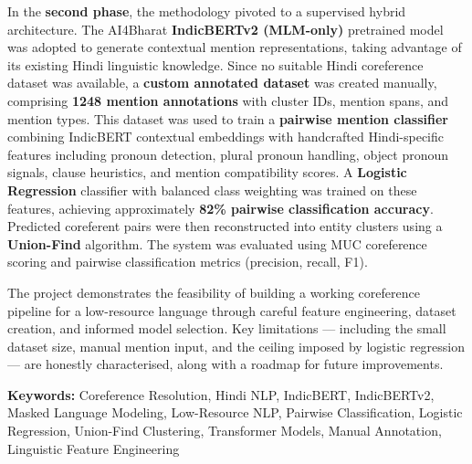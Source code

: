 \documentclass[12pt,a4paper]{report}
\begin{document}
\noindent In the \textbf{second phase}, the methodology pivoted to a supervised hybrid architecture. The AI4Bharat \textbf{IndicBERTv2 (MLM-only)} pretrained model was adopted to generate contextual mention representations, taking advantage of its existing Hindi linguistic knowledge. Since no suitable Hindi coreference dataset was available, a \textbf{custom annotated dataset} was created manually, comprising \textbf{1248 mention annotations} with cluster IDs, mention spans, and mention types. This dataset was used to train a \textbf{pairwise mention classifier} combining IndicBERT contextual embeddings with handcrafted Hindi-specific features including pronoun detection, plural pronoun handling, object pronoun signals, clause heuristics, and mention compatibility scores. A \textbf{Logistic Regression} classifier with balanced class weighting was trained on these features, achieving approximately \textbf{82\% pairwise classification accuracy}. Predicted coreferent pairs were then reconstructed into entity clusters using a \textbf{Union-Find} algorithm. The system was evaluated using MUC coreference scoring and pairwise classification metrics (precision, recall, F1).

\noindent The project demonstrates the feasibility of building a working coreference pipeline for a low-resource language through careful feature engineering, dataset creation, and informed model selection. Key limitations --- including the small dataset size, manual mention input, and the ceiling imposed by logistic regression --- are honestly characterised, along with a roadmap for future improvements.

\vspace{0.5cm}
\noindent \textbf{Keywords:} Coreference Resolution, Hindi NLP, IndicBERT, IndicBERTv2, Masked Language Modeling, Low-Resource NLP, Pairwise Classification, Logistic Regression, Union-Find Clustering, Transformer Models, Manual Annotation, Linguistic Feature Engineering

\newpage
\tableofcontents

\newpage
\listoffigures
{}

\newpage
\listoftables
{}

\newpage
{}
\setcounter{page}{1}


\end{document}
